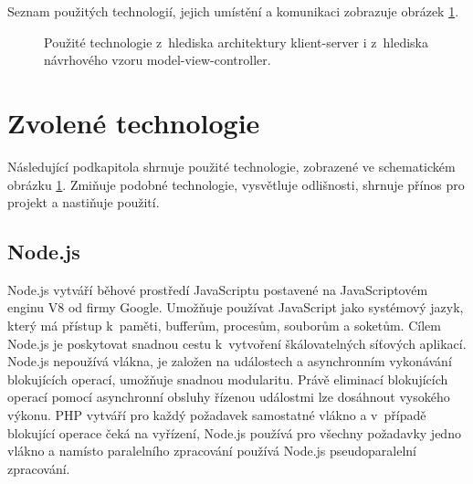 Seznam použitých technologií, jejich umístění a komunikaci zobrazuje obrázek \ref{img:server-architektura}.
\begin{figure}[h]
	\centering
	\caption{Použité technologie z~hlediska architektury klient-server i z~hlediska návrhového vzoru model-view-controller.}\label{img:server-architektura}
\end{figure}

\section{Zvolené technologie}
Následující podkapitola shrnuje použité technologie, zobrazené ve schematickém obrázku \ref{img:server-architektura}. Zmiňuje podobné technologie, vysvětluje odlišnosti, shrnuje přínos pro projekt a nastiňuje použití.

\subsection{Node.js}
Node.js vytváří běhové prostředí JavaScriptu postavené na JavaScriptovém enginu V8 od firmy Google. Umožňuje používat JavaScript jako systémový jazyk, který má přístup k~paměti, bufferům, procesům, souborům a soketům. Cílem Node.js je poskytovat snadnou cestu k~vytvoření škálovatelných síťových aplikací. Node.js nepoužívá vlákna, je založen na událostech a asynchronním vykonávání blokujících operací, umožňuje snadnou modularitu. Právě eliminací blokujících operací pomocí asynchronní obsluhy řízenou událostmi lze dosáhnout vysokého výkonu. PHP vytváří pro každý požadavek samostatné vlákno a v~případě blokující operace čeká na vyřízení, Node.js používá pro všechny požadavky jedno vlákno a namísto paralelního zpracování používá Node.js pseudoparalelní zpracování.

